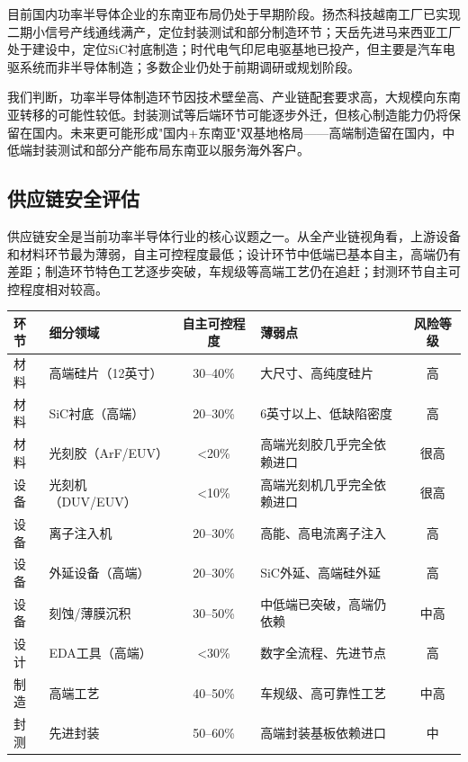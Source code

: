 目前国内功率半导体企业的东南亚布局仍处于早期阶段。扬杰科技越南工厂已实现二期小信号产线通线满产，定位封装测试和部分制造环节；天岳先进马来西亚工厂处于建设中，定位SiC衬底制造；时代电气印尼电驱基地已投产，但主要是汽车电驱系统而非半导体制造；多数企业仍处于前期调研或规划阶段。

我们判断，功率半导体制造环节因技术壁垒高、产业链配套要求高，大规模向东南亚转移的可能性较低。封装测试等后端环节可能逐步外迁，但核心制造能力仍将保留在国内。未来更可能形成"国内+东南亚"双基地格局——高端制造留在国内，中低端封装测试和部分产能布局东南亚以服务海外客户。

\subsection{供应链安全评估}

供应链安全是当前功率半导体行业的核心议题之一。从全产业链视角看，上游设备和材料环节最为薄弱，自主可控程度最低；设计环节中低端已基本自主，高端仍有差距；制造环节特色工艺逐步突破，车规级等高端工艺仍在追赶；封测环节自主可控程度相对较高。

\begin{exhibitbox}[表 8-7：功率半导体供应链薄弱环节评估]
\centering
\small
\begin{tabularx}{\textwidth}{X L{3cm} c L{3.5cm} c}
\toprule
\textbf{环节} & \textbf{细分领域} & \textbf{自主可控程度} & \textbf{薄弱点} & \textbf{风险等级} \\
\midrule
材料 & 高端硅片（12英寸） & 30--40\% & 大尺寸、高纯度硅片 & \textcolor{riskred}{高} \\
材料 & SiC衬底（高端） & 20--30\% & 6英寸以上、低缺陷密度 & \textcolor{riskred}{高} \\
材料 & 光刻胶（ArF/EUV） & <20\% & 高端光刻胶几乎完全依赖进口 & \textcolor{riskred}{很高} \\
设备 & 光刻机（DUV/EUV） & <10\% & 高端光刻机几乎完全依赖进口 & \textcolor{riskred}{很高} \\
设备 & 离子注入机 & 20--30\% & 高能、高电流离子注入 & \textcolor{riskred}{高} \\
设备 & 外延设备（高端） & 20--30\% & SiC外延、高端硅外延 & \textcolor{riskred}{高} \\
设备 & 刻蚀/薄膜沉积 & 30--50\% & 中低端已突破，高端仍依赖 & \textcolor{riskamber}{中高} \\
设计 & EDA工具（高端） & <30\% & 数字全流程、先进节点 & \textcolor{riskred}{高} \\
制造 & 高端工艺 & 40--50\% & 车规级、高可靠性工艺 & \textcolor{riskamber}{中高} \\
封测 & 先进封装 & 50--60\% & 高端封装基板依赖进口 & \textcolor{riskamber}{中} \\
\bottomrule
\end{tabularx}
\end{exhibitbox}

